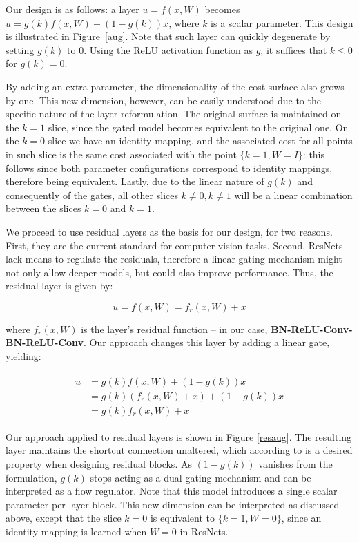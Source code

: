 \documentclass{article} %
\begin{document}
Our design is as follows: a layer $u = f(x,W)$ becomes $u = g(k) f(x,W) + (1 - g(k)) x$, where $k$ is a scalar parameter. This design is illustrated in Figure~\ref{aug}. Note that such layer can quickly degenerate by setting $g(k)$ to $0$. Using the ReLU activation function as $g$, it suffices that $k \leq 0$ for $g(k) = 0$.

By adding an extra parameter, the dimensionality of the cost surface also grows by one. This new dimension, however, can be easily understood due to the specific nature of the layer reformulation. The original surface is maintained on the $k = 1$ slice, since the gated model becomes equivalent to the original one. On the $k = 0$ slice we have an identity mapping, and the associated cost for all points in such slice is the same cost associated with the point $\{k = 1, W = I\}$: this follows since both parameter configurations correspond to identity mappings, therefore being equivalent. Lastly, due to the linear nature of  $g(k)$ and consequently of the gates, all other slices $k \neq 0, k \neq 1$ will be a linear combination between the slices $k = 0$ and $k = 1$.

We proceed to use residual layers as the basis for our design, for two reasons. First, they are the current standard for computer vision tasks. Second, ResNets lack means to regulate the residuals, therefore a linear gating mechanism might not only allow deeper models, but could also improve performance. Thus, the residual layer is given by:

\begin{equation*}
	u = f(x,W) = f_r(x, W) + x
\end{equation*}

where $f_r(x,W)$ is the layer's residual function -- in our case, \textbf{BN-ReLU-Conv-BN-ReLU-Conv}. Our approach changes this layer by adding a linear gate, yielding:

\begin{align*}
\begin{split}
	 u &= g(k) f(x,W) + (1 - g(k))x \\
	&=  g(k) ( f_r(x, W) + x ) + (1 - g(k))x \\
	&= g(k) f_r(x,W) + x
\end{split}
\end{align*}

Our approach applied to residual layers is shown in Figure \ref{resaug}. The resulting layer maintains the shortcut connection unaltered, which according to \cite{resnet2} is a desired property when designing residual blocks. As $(1 - g(k))$ vanishes from the formulation, $g(k)$ stops acting as a dual gating mechanism and can be interpreted as a flow regulator. Note that this model introduces a single scalar parameter per layer block. This new dimension can be interpreted as discussed above, except that the slice $k = 0$ is equivalent to $\{k = 1, W = 0\}$, since an identity mapping is learned when $W = 0$ in ResNets.
\end{document}
